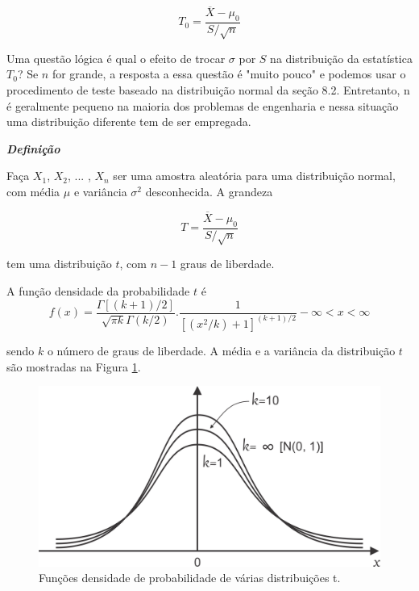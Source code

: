 \documentclass[a4paper,12pt]{article} %
\begin{document}
	\begin{blockquote}
		\begin{equation}
			\tag{8.39}
			T_0 = \frac{\overline{X} - \mu_0}{S / \sqrt{n}}
		\end{equation}  
	\end{blockquote}
	
	Uma questão lógica é qual o efeito de trocar $\sigma$ por $S$ na distribuição da estatística $T_0$? Se $n$ for grande, a resposta a essa questão é "muito pouco" e podemos usar o procedimento de teste baseado na distribuição normal da seção 8.2. Entretanto, n é geralmente pequeno na maioria dos problemas de engenharia e nessa situação uma distribuição diferente tem de ser empregada.
	
	\begin{blockquote}
		\begin{center}
			\textbf{\textit{Definição }} 
		\end{center}
		
		Faça $ X_1 $, $ X_2 $, ... , $ X_n $ ser uma amostra aleatória para uma distribuição normal, com média $\mu$  e variância $\sigma^2$ desconhecida. A grandeza
		
		\begin{equation*}
			T = \frac{\overline{X} - \mu_0}{S / \sqrt{n}}
		\end{equation*}
		
		
		tem uma distribuição $ t $, com $ n-1 $ graus de liberdade.
	\end{blockquote}

	A função densidade da probabilidade $t$ é
	\begin{equation*}
		\tag{8.40}
		f(x) = \frac{\Gamma \left[ \left( k + 1 \right) /2 \right] }{\sqrt{ \pi k  }\Gamma \left( k/2 \right)  } . \frac{1}{\left[ \left( x^2 / k \right) + 1  \right]^{\left( k+1 \right)/2 } } - \infty  < x < \infty 
	\end{equation*}

	sendo $k$ o número de graus de liberdade. A média e a variância da distribuição $t$ são mostradas na Figura \ref{8.11}.
	
	
	\begin{figure}[H]
		\centering
		\includegraphics[width=0.7\linewidth]{fig1}
		\caption[]{Funções densidade de probabilidade de várias distribuições t.}
		\label{8.11}
	\end{figure}
\end{document}
